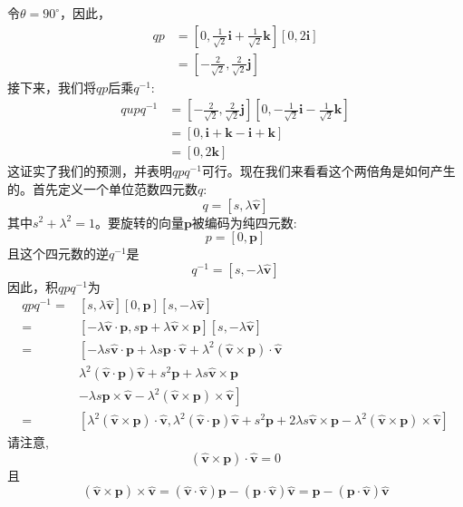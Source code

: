 令$\theta=90^{\circ}$，因此，
$$
\begin{aligned}
q p & =\left[0, \frac{1}{\sqrt{2}} \mathbf{i}+\frac{1}{\sqrt{2}} \mathbf{k}\right][0,2 \mathbf{i}] \\
& =\left[-\frac{2}{\sqrt{2}}, \frac{2}{\sqrt{2}} \mathbf{j}\right]
\end{aligned}
$$
接下来，我们将$q p$后乘$q^{-1}$:
$$
\begin{aligned}
q u p q^{-1} & =\left[-\frac{2}{\sqrt{2}}, \frac{2}{\sqrt{2}} \mathbf{j}\right]\left[0,-\frac{1}{\sqrt{2}} \mathbf{i}-\frac{1}{\sqrt{2}} \mathbf{k}\right] \\
& =[0, \mathbf{i}+\mathbf{k}-\mathbf{i}+\mathbf{k}] \\
& =[0,2 \mathbf{k}]
\end{aligned}
$$
这证实了我们的预测，并表明$q p q^{-1}$可行。现在我们来看看这个两倍角是如何产生的。首先定义一个单位范数四元数$q$:
$$
q=[s, \lambda \hat{\mathbf{v}}]
$$
其中$s^{2}+\lambda^{2}=1$。要旋转的向量$\mathbf{p}$被编码为纯四元数:
$$
p=[0, \mathbf{p}]
$$
且这个四元数的逆$q^{-1}$是
$$
q^{-1}=[s,-\lambda \hat{\mathbf{v}}]
$$
因此，积$q p q^{-1}$为
$$
\begin{aligned}
q p q^{-1}= & {[s, \lambda \hat{\mathbf{v}}][0, \mathbf{p}][s,-\lambda \hat{\mathbf{v}}] } \\
= & {[-\lambda \hat{\mathbf{v}} \cdot \mathbf{p}, s \mathbf{p}+\lambda \hat{\mathbf{v}} \times \mathbf{p}][s,-\lambda \hat{\mathbf{v}}] } \\
= & {\left[-\lambda s \hat{\mathbf{v}} \cdot \mathbf{p}+\lambda s \mathbf{p} \cdot \hat{\mathbf{v}}+\lambda^{2}(\hat{\mathbf{v}} \times \mathbf{p}) \cdot \hat{\mathbf{v}}\right.} \\
& \lambda^{2}(\hat{\mathbf{v}} \cdot \mathbf{p}) \hat{\mathbf{v}}+s^{2} \mathbf{p}+\lambda s \hat{\mathbf{v}} \times \mathbf{p} \\
& \left.-\lambda s \mathbf{p} \times \hat{\mathbf{v}}-\lambda^{2}(\hat{\mathbf{v}} \times \mathbf{p}) \times \hat{\mathbf{v}}\right] \\
= & {\left[\lambda^{2}(\hat{\mathbf{v}} \times \mathbf{p}) \cdot \hat{\mathbf{v}}, \lambda^{2}(\hat{\mathbf{v}} \cdot \mathbf{p}) \hat{\mathbf{v}}+s^{2} \mathbf{p}+2 \lambda s \hat{\mathbf{v}} \times \mathbf{p}-\lambda^{2}(\hat{\mathbf{v}} \times \mathbf{p}) \times \hat{\mathbf{v}}\right] }
\end{aligned}
$$
请注意,
$$
(\hat{\mathbf{v}} \times \mathbf{p}) \cdot \hat{\mathbf{v}}=0
$$
且
$$
(\hat{\mathbf{v}} \times \mathbf{p}) \times \hat{\mathbf{v}}=(\hat{\mathbf{v}} \cdot \hat{\mathbf{v}}) \mathbf{p}-(\mathbf{p} \cdot \hat{\mathbf{v}}) \hat{\mathbf{v}}=\mathbf{p}-(\mathbf{p} \cdot \hat{\mathbf{v}}) \hat{\mathbf{v}}
$$
